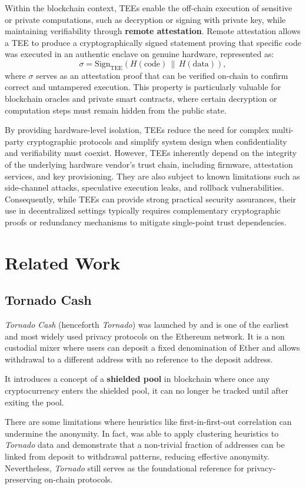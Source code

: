 \documentclass[12pt,a4paper]{article}
\begin{document}
Within the blockchain context, TEEs enable the off-chain execution of sensitive or private computations, such as decryption or signing with private key, while maintaining verifiability through \textbf{remote attestation}.  
Remote attestation allows a TEE to produce a cryptographically signed statement proving that specific code was executed in an authentic enclave on genuine hardware, represented as:
$$
\sigma = \text{Sign}_{\text{TEE}}(H(\text{code}) \, \| \, H(\text{data})),
$$
where $\sigma$ serves as an attestation proof that can be verified on-chain to confirm correct and untampered execution. This property is particularly valuable for blockchain oracles and private smart contracts, where certain decryption or computation steps must remain hidden from the public state.

By providing hardware-level isolation, TEEs reduce the need for complex multi-party cryptographic protocols and simplify system design when confidentiality and verifiability must coexist.  
However, TEEs inherently depend on the integrity of the underlying hardware vendor’s trust chain, including firmware, attestation services, and key provisioning.  
They are also subject to known limitations such as side-channel attacks, speculative execution leaks, and rollback vulnerabilities.  
Consequently, while TEEs can provide strong practical security assurances, their use in decentralized settings typically requires complementary cryptographic proofs or redundancy mechanisms to mitigate single-point trust dependencies.


\section{Related Work}
\subsection{Tornado Cash}
\textit{Tornado Cash} (henceforth \textit{Tornado}) was launched by \textcite{pertsev2019tornado} and is one of the earliest and most widely used privacy protocols on the Ethereum network. It is a non custodial mixer where users can deposit a fixed denomination of Ether and allows withdrawal to a different address with no reference to the deposit address. 

It introduces a concept of a \textbf{shielded pool} in blockchain where once any cryptocurrency enters the shielded pool, it can no longer be tracked until after exiting the pool.

There are some limitations where heuristics like first-in-first-out correlation can undermine the anonymity. In fact, \textcite{tang2021analysis} was able to apply clustering heuristics to \textit{Tornado} data and demonstrate that a non-trivial fraction of addresses can be linked from deposit to withdrawal patterns, reducing effective anonymity. Nevertheless, \textit{Tornado} still serves as the foundational reference for privacy-preserving on-chain protocols. 
\end{document}
